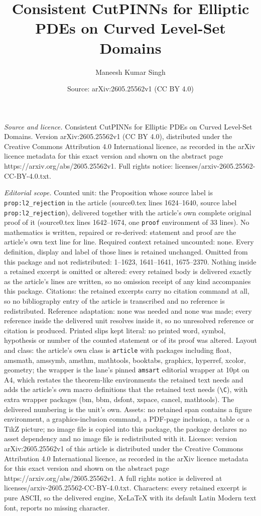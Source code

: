 \documentclass[10pt,a4paper]{amsart}
\title[Consistent CutPINNs for Elliptic PDEs on Curved Level-Set Do]{Consistent CutPINNs for Elliptic PDEs on Curved Level-Set Domains}
\author{Maneesh Kumar Singh}
\date{Source: arXiv:2605.25562v1 (CC BY 4.0)}
\begin{document}
\maketitle

\noindent\emph{Source and licence.} Consistent CutPINNs for Elliptic PDEs on Curved Level-Set Domains. Version arXiv:2605.25562v1 (CC BY 4.0), distributed under the Creative Commons Attribution 4.0 International licence, as recorded in the arXiv licence metadata for this exact version and shown on the abstract page https://arxiv.org/abs/2605.25562v1. Full rights notice: licenses/arxiv-2605.25562-CC-BY-4.0.txt.\par\smallskip

\noindent\textit{Editorial scope.} Counted unit: the Proposition whose source label is \texttt{prop:l2\_rejection} in the article (source0.tex lines 1624--1640, source label \texttt{prop:l2\_rejection}), delivered together with the article's own complete original proof of it (source0.tex lines 1642--1674, one \texttt{proof} environment of 33 lines). No mathematics is written, repaired or re-derived: statement and proof are the article's own text line for line. Required context retained uncounted: none. Every definition, display and label of those lines is retained unchanged. Omitted from this package and not redistributed: 1--1623, 1641--1641, 1675--2370. Nothing inside a retained excerpt is omitted or altered: every retained body is delivered exactly as the article's lines are written, so no omission receipt of any kind accompanies this package. Citations: the retained excerpts carry no citation command at all, so no bibliography entry of the article is transcribed and no reference is redistributed. Reference adaptation: none was needed and none was made; every reference inside the delivered unit resolves inside it, so no unresolved reference or citation is produced. Printed slips kept literal: no printed word, symbol, hypothesis or number of the counted statement or of its proof was altered. Layout and class: the article's own class is \texttt{article} with packages including float, amsmath, amssymb, amsthm, mathtools, booktabs, graphicx, hyperref, xcolor, geometry; the wrapper is the lane's pinned \texttt{amsart} editorial wrapper at 10pt on A4, which restates the theorem-like environments the retained text needs and adds the article's own macro definitions that the retained text needs (\texttt{\textbackslash C}), with extra wrapper packages (bm, bbm, dsfont, xspace, cancel, mathtools). The delivered numbering is the unit's own. Assets: no retained span contains a figure environment, a graphics-inclusion command, a PDF-page inclusion, a table or a TikZ picture; no image file is copied into this package, the package declares no asset dependency and no image file is redistributed with it. Licence: version arXiv:2605.25562v1 of this article is distributed under the Creative Commons Attribution 4.0 International licence, as recorded in the arXiv licence metadata for this exact version and shown on the abstract page https://arxiv.org/abs/2605.25562v1. A full rights notice is delivered at licenses/arxiv-2605.25562-CC-BY-4.0.txt. Characters: every retained excerpt is pure ASCII, so the delivered engine, XeLaTeX with its default Latin Modern text font, reports no missing character.
\end{document}
